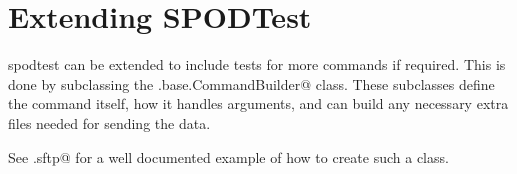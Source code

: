 \section{Extending SPODTest}

\gls{spodtest} can be extended to include tests for more commands if required.
This is done by subclassing the \verb@testers.base.CommandBuilder@ class. These
subclasses define the command itself, how it handles arguments, and can build
any necessary extra files needed for sending the data.

See \verb@testers.sftp@ for a well documented example of how to create such a
class.
